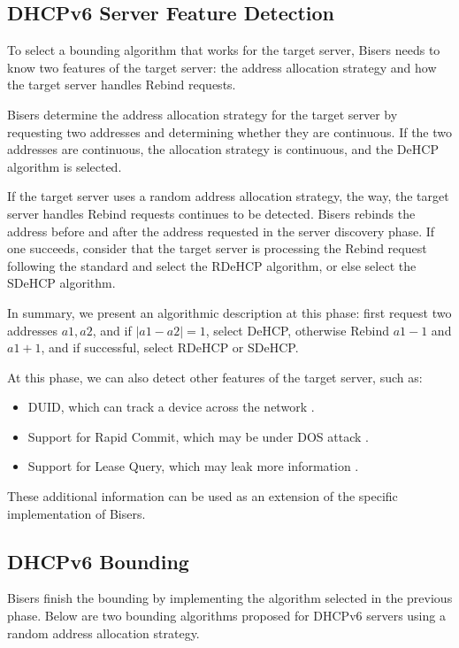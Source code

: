\documentclass[conference]{IEEEtran}
\begin{document}
\subsection{DHCPv6 Server Feature Detection}

To select a bounding algorithm that works for the target server,
Bisers needs to know two features of the target server: the address
allocation strategy and how the target server handles Rebind requests.

Bisers determine the address allocation strategy for the target server
by requesting two addresses and determining whether they are
continuous. If the two addresses are continuous, the allocation
strategy is continuous, and the DeHCP algorithm is selected.

If the target server uses a random address allocation strategy, the
way, the target server handles Rebind requests continues to be
detected. Bisers rebinds the address before and after the address
requested in the server discovery phase. If one succeeds, consider
that the target server is processing the Rebind request following the
standard and select the RDeHCP algorithm, or else select the SDeHCP
algorithm.

In summary, we present an algorithmic description at this phase: first
request two addresses $a1, a2$, and if $|a1-a2| = 1$, select DeHCP,
otherwise Rebind $a1-1$ and $a1+1$, and if successful, select RDeHCP
or SDeHCP.

At this phase, we can also detect other features of the target server,
such as:

\begin{itemize}
\item DUID, which can track a device across the network
  \cite{tront_security_2011} \cite{noauthor_what_nodate}.
\item Support for Rapid Commit, which may be under DOS attack
  \cite{carney_dynamic_2003} \cite{mrugalski_dynamic_2018}.
\item Support for Lease Query, which may leak more information \cite{zeng_dhcpv6_2007}.
\end{itemize}

These additional information can be used as an extension of the
specific implementation of Bisers.

\subsection{DHCPv6 Bounding}

Bisers finish the bounding by implementing the algorithm selected in
the previous phase. Below are two bounding algorithms proposed for
DHCPv6 servers using a random address allocation strategy.
\end{document}

